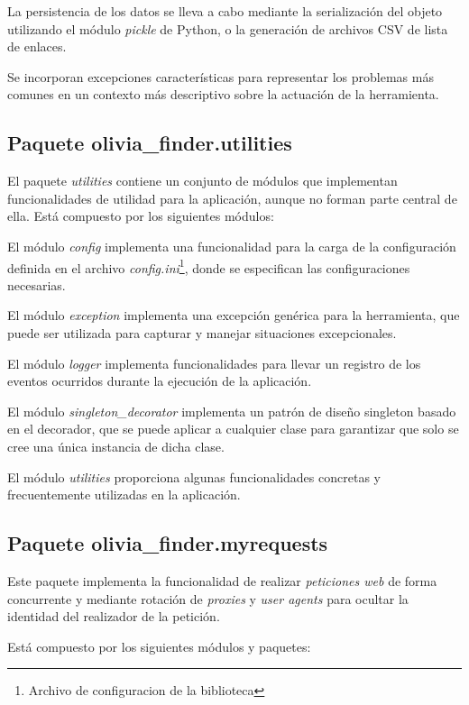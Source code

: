 La persistencia de los datos se lleva a cabo mediante la serialización del objeto utilizando el 
módulo \textit{pickle} de Python, o la generación de archivos CSV de lista de enlaces.

Se incorporan excepciones características para representar los problemas más comunes en un contexto 
más descriptivo sobre la actuación de la herramienta.

\subsection{Paquete olivia\_finder.utilities}

El paquete \textit{utilities} contiene un conjunto de módulos que implementan funcionalidades de 
utilidad para la aplicación, aunque no forman parte central de ella. Está compuesto por los siguientes módulos:

El módulo \textit{config} implementa una funcionalidad para la carga de la configuración 
definida en el archivo \textit{config.ini}\footnote{Archivo de configuracion de la biblioteca}, donde se especifican las configuraciones necesarias.

El módulo \textit{exception} implementa una excepción genérica para la herramienta, que 
puede ser utilizada para capturar y manejar situaciones excepcionales.

El módulo \textit{logger} implementa funcionalidades para llevar un registro de los 
eventos ocurridos durante la ejecución de la aplicación.

El módulo \textit{singleton\_decorator} implementa un patrón de diseño singleton basado 
en el decorador, que se puede aplicar a cualquier clase para garantizar que solo se cree una 
única instancia de dicha clase.

El módulo \textit{utilities} proporciona algunas funcionalidades concretas y frecuentemente 
utilizadas en la aplicación.

\subsection{Paquete olivia\_finder.myrequests}

Este paquete implementa la funcionalidad de realizar \textit{peticiones web} de forma concurrente 
y mediante rotación de \textit{proxies} y \textit{user agents} para ocultar la identidad del realizador
 de la petición.

Está compuesto por los siguientes módulos y paquetes:

